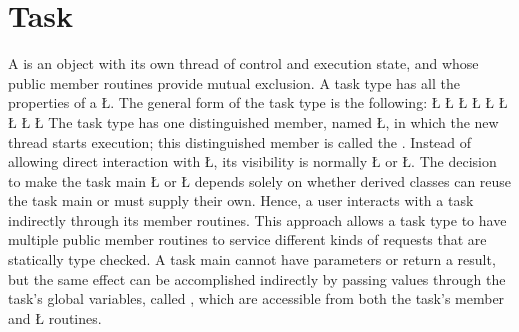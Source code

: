 \documentclass[openright,twoside]{report}
\begin{document}
\section{Task}
\label{s:Task}

A  is an object with its own thread of control and execution state, and whose public member routines provide mutual exclusion.
A task type has all the properties of a \LGinlinetrue\LGbegin\lgrinde\L{}\endlgrinde\LGend{}.
The general form of the task type is the following:
\LGinlinefalse\LGbegin\lgrinde
\L{}
\L{}
\L{\LB{}}
\CE{}\L{}
\L{\LB{}}
\CE{}\L{\LB{}}
\CE{}\L{}
\L{\LB{}}
\CE{}\L{\LB{\};}}
\endlgrinde\LGend
{}%
The task type has one distinguished member, named \LGinlinetrue\LGbegin\lgrinde\L{}\endlgrinde\LGend{}, in which the new thread starts execution;
this distinguished member is called the .
Instead of allowing direct interaction with \LGinlinetrue\LGbegin\lgrinde\L{}\endlgrinde\LGend{}, its visibility is normally \LGinlinetrue\LGbegin\lgrinde\L{}\endlgrinde\LGend{} or \LGinlinetrue\LGbegin\lgrinde\L{}\endlgrinde\LGend{}.
The decision to make the task main \LGinlinetrue\LGbegin\lgrinde\L{}\endlgrinde\LGend{} or \LGinlinetrue\LGbegin\lgrinde\L{}\endlgrinde\LGend{} depends solely on whether derived classes can reuse the task main or must supply their own.
Hence, a user interacts with a task indirectly through its member routines.
This approach allows a task type to have multiple public member routines to service different kinds of requests that are statically type checked.
A task main cannot have parameters or return a result, but the same effect can be accomplished indirectly by passing values through the task's global variables, called , which are accessible from both the task's member and \LGinlinetrue\LGbegin\lgrinde\L{}\endlgrinde\LGend{} routines.
\end{document}
